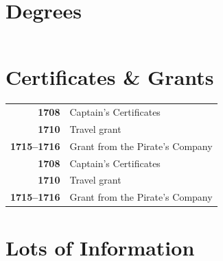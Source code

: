 \documentclass{modernsimplecv}
\newlength{\leftcolwidth}
\begin{document}
\begin{paracol}{2}
{\begin{minipage}[t]{\leftcolwidth}
\section*{Degrees}
\begin{tabular}{r p{} c}
\end{tabular}
\end{minipage}\hfill

\vspace{3em}

\begin{minipage}[t]{\leftcolwidth}
\section*{Certificates \& Grants}
\begin{tabular}{>{\footnotesize\bfseries}r >{\footnotesize}p{}}
    1708 & Captain's Certificates \\
    1710 & Travel grant \\
    1715--1716 & Grant from the Pirate's Company\\
    1708 & Captain's Certificates \\
    1710 & Travel grant \\
    1715--1716 & Grant from the Pirate's Company
\end{tabular}
\bigskip

\end{minipage}\hfill


\vspace{2em}

\begin{minipage}[t]{\leftcolwidth}
\section*{Lots of Information}
\begin{tabular}{r| p{} c}
\end{tabular}


\end{minipage}}
\end{paracol}
\end{document}
